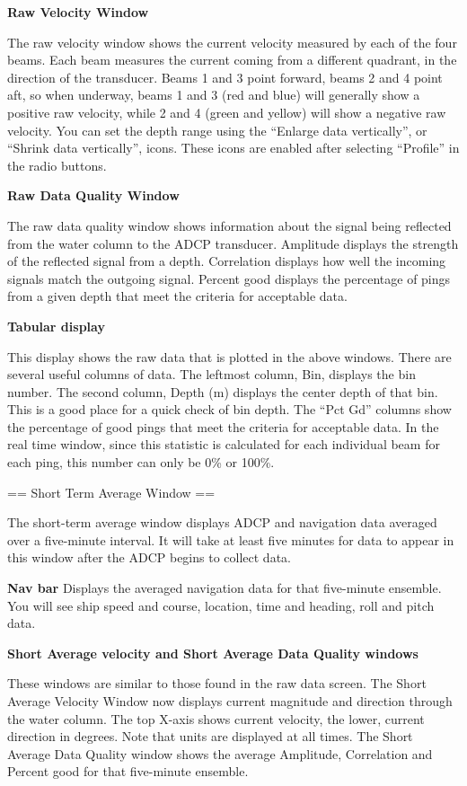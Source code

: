 \documentclass[]{book}
\theoremstyle{definition}
\theoremstyle{definition}
\theoremstyle{definition}
\theoremstyle{remark}
\begin{document}
\textbf{Raw Velocity Window}

The raw velocity window shows the current velocity measured by each of
the four beams. Each beam measures the current coming from a different
quadrant, in the direction of the transducer. Beams 1 and 3 point
forward, beams 2 and 4 point aft, so when underway, beams 1 and 3 (red
and blue) will generally show a positive raw velocity, while 2 and 4
(green and yellow) will show a negative raw velocity. You can set the
depth range using the ``Enlarge data vertically'', or ``Shrink data
vertically'', icons. These icons are enabled after selecting ``Profile''
in the radio buttons.

\textbf{Raw Data Quality Window}

The raw data quality window shows information about the signal being
reflected from the water column to the ADCP transducer. Amplitude
displays the strength of the reflected signal from a depth. Correlation
displays how well the incoming signals match the outgoing signal.
Percent good displays the percentage of pings from a given depth that
meet the criteria for acceptable data.

\textbf{Tabular display}

This display shows the raw data that is plotted in the above windows.
There are several useful columns of data. The leftmost column, Bin,
displays the bin number. The second column, Depth (m) displays the
center depth of that bin. This is a good place for a quick check of bin
depth. The ``Pct Gd'' columns show the percentage of good pings that
meet the criteria for acceptable data. In the real time window, since
this statistic is calculated for each individual beam for each ping,
this number can only be 0\% or 100\%.

== Short Term Average Window ==

The short-term average window displays ADCP and navigation data averaged
over a five-minute interval. It will take at least five minutes for data
to appear in this window after the ADCP begins to collect data.

\textbf{Nav bar} Displays the averaged navigation data for that
five-minute ensemble. You will see ship speed and course, location, time
and heading, roll and pitch data.

\textbf{Short Average velocity and Short Average Data Quality windows}

These windows are similar to those found in the raw data screen. The
Short Average Velocity Window now displays current magnitude and
direction through the water column. The top X-axis shows current
velocity, the lower, current direction in degrees. Note that units are
displayed at all times. The Short Average Data Quality window shows the
average Amplitude, Correlation and Percent good for that five-minute
ensemble.
\end{document}
